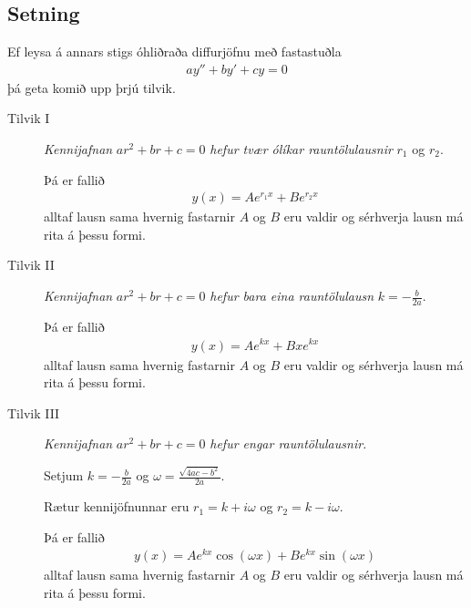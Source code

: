 \documentclass[a4paper,10pt,icelandic]{sphinxmanual}
\begin{document}
\subsection{Setning}
\label{kafli08:id3}\label{kafli08:stigs-ohlidrud}
Ef leysa á annars stigs óhliðraða diffurjöfnu með fastastuðla
\begin{equation*}
\begin{split}ay''+by'+cy=0\end{split}
\end{equation*}
þá geta komið upp þrjú tilvik.
\begin{description}
\item[{Tilvik I}] \leavevmode
\emph{Kennijafnan} \(ar^2+br+c=0\) \emph{hefur tvær ólíkar rauntölulausnir}
\(r_1\) og \(r_2\).

Þá er fallið
\begin{equation*}
\begin{split}y(x)=Ae^{r_1x}+Be^{r_2x}\end{split}
\end{equation*}
alltaf lausn sama hvernig fastarnir \(A\) og \(B\) eru
valdir og sérhverja lausn má rita á þessu formi.

\item[{Tilvik II}] \leavevmode
\emph{Kennijafnan} \(ar^2+br+c=0\) \emph{hefur bara eina rauntölulausn}
\(k=-\frac{b}{2a}\).

Þá er fallið
\begin{equation*}
\begin{split}y(x)=Ae^{kx}+Bxe^{kx}\end{split}
\end{equation*}
alltaf lausn sama hvernig fastarnir \(A\) og \(B\) eru
valdir og sérhverja lausn má rita á þessu formi.

\item[{Tilvik III}] \leavevmode
\emph{Kennijafnan} \(ar^2+br+c=0\) \emph{hefur engar rauntölulausnir.}

Setjum \(k=-\frac{b}{2a}\) og
\(\omega=\frac{\sqrt{4ac-b^2}}{2a}\).

Rætur kennijöfnunnar eru \(r_1=k+i\omega\) og
\(r_2=k-i\omega\).

Þá er fallið
\begin{equation*}
\begin{split}y(x)=Ae^{kx}\cos(\omega x)+Be^{kx}\sin(\omega x)\end{split}
\end{equation*}
alltaf lausn sama hvernig fastarnir \(A\) og \(B\) eru
valdir og sérhverja lausn má rita á þessu formi.

\end{description}
\end{document}
